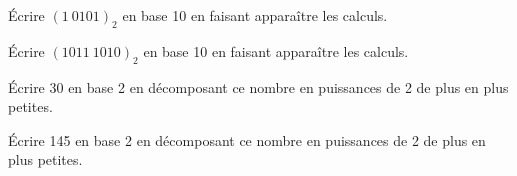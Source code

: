 \documentclass[a4paper,12pt,eval,firamath]{nsi}
\begin{document}
\maketitle

\'Ecrire $(1\ 0101)_2$ en base 10 en faisant apparaître les calculs.\\


\'Ecrire $(1011\ 1010)_2$ en base 10 en faisant apparaître les calculs.\\


\'Ecrire 30 en base 2 en décomposant ce nombre en puissances de 2 de plus en plus petites.\\


\'Ecrire 145 en base 2 en décomposant ce nombre en puissances de 2 de plus en plus petites.\\

\end{document}
